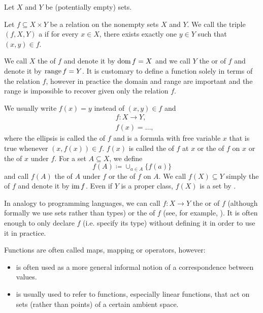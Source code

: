 \begin{definition}\label{def:function}
  Let \( X \) and \( Y \) be (potentially empty) sets.

  Let \( f \subseteq X \times Y \) be a relation on the nonempty sets \( X \) and \( Y \). We call the triple \( (f, X, Y) \) a  if for every \( x \in X \), there exists exactly one \( y \in Y \) such that \( (x, y) \in f \).

  We call \( X \) the  of \( f \) and denote it by \( \operatorname{dom} f = X \) and we call \( Y \) the  or  of \( f \) and denote it by \( \operatorname{range} f = Y \). It is customary to define a function solely in terms of the relation \( f \), however in practice the domain and range are important and the range is impossible to recover given only the relation \( f \).

  We usually write \( f(x) = y \) instead of \( (x, y) \in f \) and
  \begin{align*}
    &f: X \to Y, \\
    &f(x) = \ldots,
  \end{align*}
  where the ellipsis is called the  of \( f \) and is a formula with free variable \( x \) that is true whenever \( (x, f(x)) \in f \). \( f(x) \) is called the  of \( f \) at \( x \) or the  of \( f \) on \( x \) or the  of \( x \) under \( f \). For a set \( A \subseteq X \), we define
  \begin{equation*}
    f(A) \coloneqq \cup_{a \in A} \{ f(a) \}
  \end{equation*}
  and call \( f(A) \) the  of \( A \) under \( f \) or the  of \( f \) on \( A \). We call \( f(X) \subseteq Y \) simply the  of \( f \) and denote it by \( \operatorname{im} f \). Even if \( Y \) is a proper class, \( f(X) \) is a set by .

  In analogy to programming languages, we can call \( f: X \to Y \) the  or  of \( f \) (although formally we use sets rather than types) or the  of \( f \) (see, for example, \cite[section 2.4]{Kernighan1988}). It is often enough to only declare \( f \) (i.e. specify its type) without defining it in order to use it in practice.

  Functions are often called maps, mapping or operators, however:
  \begin{itemize}
    \item {} is often used as a more general informal notion of a correspondence between values.
    \item {} is usually used to refer to functions, especially linear functions, that act on sets (rather than points) of a certain ambient space.
  \end{itemize}


\end{definition}
